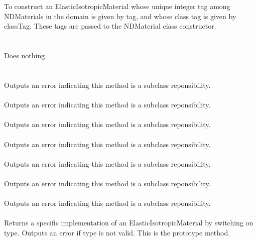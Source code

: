   \\
  \\
To construct an ElasticIsotropicMaterial whose unique integer tag
among NDMaterials in the domain is given by \p tag, and whose class
tag is given by \p classTag.  These tags are passed to the
NDMaterial class constructor. \\

 \\
 \\
Does nothing. \\ 

 \\
  \\
Outputs an error indicating this method is a subclass reponsibility. \\

 \\
Outputs an error indicating this method is a subclass reponsibility. \\

 \\
Outputs an error indicating this method is a subclass reponsibility. \\

 \\
Outputs an error indicating this method is a subclass reponsibility. \\

 \\
Outputs an error indicating this method is a subclass reponsibility. \\

 \\
Outputs an error indicating this method is a subclass reponsibility. \\

 \\
Outputs an error indicating this method is a subclass reponsibility. \\

 \\
Returns a specific implementation of an ElasticIsotropicMaterial by
switching on \p type.  Outputs an error if \p type is not valid.
This is the prototype method.
